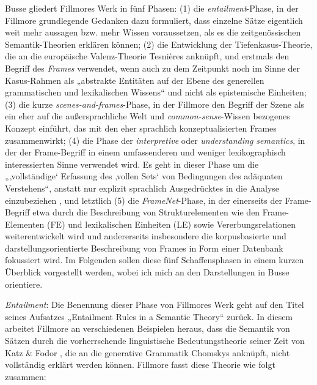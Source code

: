 Busse \autocite*[211-213]{busseFrameSemantikKompendium2012} gliedert Fillmores Werk in fünf Phasen: (1) die \emph{entailment}-Phase, in der Fillmore grundlegende Gedanken dazu formuliert, dass einzelne Sätze eigentlich weit mehr aussagen bzw. mehr Wissen voraussetzen, als es die zeitgenössischen Semantik-Theorien erklären können; (2) die Entwicklung der Tiefenkasus-Theorie, die an die europäische Valenz-Theorie Tesnières \autocite*{tesniereElementsSyntaxeStructurale1959} anknüpft, und erstmals den Begriff des \emph{Frames} verwendet, wenn auch zu dem Zeitpunkt noch im Sinne der Kasus-Rahmen als „abstrakte Entitäten auf der Ebene des generellen grammatischen und lexikalischen Wissens`` \autocite[212]{busseFrameSemantikKompendium2012} und nicht als epistemische Einheiten; (3) die kurze \emph{scenes-and-frames}-Phase, in der Fillmore den Begriff der Szene als ein eher auf die außersprachliche Welt und \emph{common-sense}-Wissen bezogenes Konzept einführt, das mit den eher sprachlich konzeptualisierten Frames zusammenwirkt; (4) die Phase der \emph{interpretive} oder \emph{understanding semantics}, in der der Frame-Begriff in einem umfassenderen und weniger lexikographisch interessierten Sinne verwendet wird. Es geht in dieser Phase um die „‚vollständige` Erfassung des ‚vollen Sets` von Bedingungen des adäquaten Verstehens``, anstatt nur explizit sprachlich Ausgedrücktes in die Analyse einzubeziehen \autocite[212]{busseFrameSemantikKompendium2012}, und letztlich (5) die \emph{FrameNet}-Phase, in der einerseits der Frame-Begriff etwa durch die Beschreibung von Strukturelementen wie den Frame-Elementen (FE) und lexikalischen Einheiten (LE) sowie Vererbungsrelationen weiterentwickelt wird und andererseits insbesondere die korpusbasierte und darstellungsorientierte Beschreibung von Frames in Form einer Datenbank fokussiert wird. Im Folgenden sollen diese fünf Schaffensphasen in einem kurzen Überblick vorgestellt werden, wobei ich mich an den Darstellungen in Busse \autocite*{busseFrameSemantikKompendium2012} orientiere.

\emph{Entailment}: Die Benennung dieser Phase von Fillmores Werk geht auf den Titel seines Aufsatzes „Entailment Rules in a Semantic Theory`` \autocite*{fillmoreEntailmentRulesSemantic1965} zurück. In diesem arbeitet Fillmore an verschiedenen Beispielen heraus, dass die Semantik von Sätzen durch die vorherrschende linguistische Bedeutungstheorie seiner Zeit von Katz \& Fodor \autocite*{katzStructureSemanticTheory1963}, die an die generative Grammatik Chomskys anknüpft, nicht vollständig erklärt werden können. Fillmore fasst diese Theorie wie folgt zusammen:

